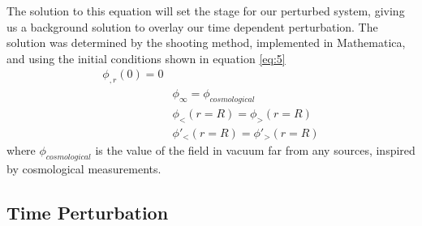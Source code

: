 \documentclass[12pt,a4paper]{article} %
\begin{document}
The solution to this equation will set the stage for our perturbed system, giving us a background solution to overlay our time dependent perturbation. The solution was determined by the shooting method, implemented in Mathematica, and using the initial conditions shown in equation \ref{eq:5}
\begin{equation}\label{eq:5}
\begin{split}
\phi_{,r}(0) = 0 \\
&\phi_{\infty} = \phi_{cosmological}\\
& \phi_{<}(r=R) = \phi_{>}(r=R)\\
&\phi'_{<}(r=R) = \phi'_{>}(r=R)
\end{split}
\end{equation}
where $\phi_{cosmological}$ is the value of the field in vacuum far from any sources, inspired by cosmological measurements. 
\subsection{Time Perturbation}
\end{document}
